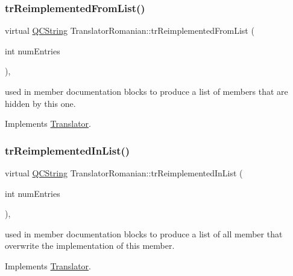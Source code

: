 \subsubsection{\texorpdfstring{trReimplementedFromList()}{trReimplementedFromList()}}
{\footnotesize\ttfamily virtual \mbox{\hyperlink{class_q_c_string}{Q\+C\+String}} Translator\+Romanian\+::tr\+Reimplemented\+From\+List (\begin{DoxyParamCaption}\item[{int}]{num\+Entries }\end{DoxyParamCaption})\hspace{0.3cm}{\ttfamily [inline]}, {\ttfamily [virtual]}}

used in member documentation blocks to produce a list of members that are hidden by this one. 

Implements \mbox{\hyperlink{class_translator}{Translator}}.

\mbox{\label{class_translator_romanian_a702895042cb8b098c21ab06e30e77387}} 
\subsubsection{\texorpdfstring{trReimplementedInList()}{trReimplementedInList()}}
{\footnotesize\ttfamily virtual \mbox{\hyperlink{class_q_c_string}{Q\+C\+String}} Translator\+Romanian\+::tr\+Reimplemented\+In\+List (\begin{DoxyParamCaption}\item[{int}]{num\+Entries }\end{DoxyParamCaption})\hspace{0.3cm}{\ttfamily [inline]}, {\ttfamily [virtual]}}

used in member documentation blocks to produce a list of all member that overwrite the implementation of this member. 

Implements \mbox{\hyperlink{class_translator}{Translator}}.

\mbox{\label{class_translator_romanian_a42e7e32e563f56ed34df16a11e5ea450}} 
